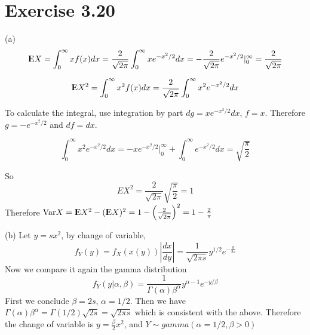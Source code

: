 \documentclass[12pt]{article}
\begin{document}
\section*{Exercise 3.20}
(a) $$ {\rm I\kern-.3em E} X = \int^{\infty}_{0} xf(x) dx = \frac{2}{\sqrt{2\pi}} \int^{\infty}_{0} x e^{-x^2/2} dx
 = - \frac{2}{\sqrt{2\pi}} e^{-x^2/2} |^{\infty}_{0} =  \frac{2}{\sqrt{2\pi}}$$
 
 $${\rm I\kern-.3em E} X^2 = \int^{\infty}_{0} x^2f(x) dx =  \frac{2}{\sqrt{2\pi}} \int^{\infty}_{0} x^2 e^{-x^2/2} dx$$
 
To calculate the integral, use integration by part $dg = x e^{-x^2/2}dx$, $f = x$. Therefore $g = -e^{-x^2/2}$ and $df=dx$. 

$$\int^{\infty}_{0} x^2 e^{-x^2/2} dx = -xe^{-x^2/2}|^{\infty}_{0} + \int^{\infty}_{0} e^{-x^2/2} dx = \sqrt{\frac{\pi}{2}}$$

So $$EX^2 = \frac{2}{\sqrt{2\pi}}  \sqrt{\frac{\pi}{2}} = 1$$
Therefore $\mathrm{Var} X = {\rm I\kern-.3em E} X^2 - ({\rm I\kern-.3em E} X)^2 = 1 - \left( \frac{2}{\sqrt{2\pi}}\right)^2 = 1 - \frac{2}{\pi}$ 

(b) Let $y=sx^2$, by change of variable,
$$ f_Y(y) = f_X(x(y)) \left| \frac{dx}{dy} \right| = \frac{1}{\sqrt{2\pi s}} y^{1/2} e^{-\frac{y}{2s}}$$
Now we compare it again the gamma distribution $$ f_Y(y|\alpha, \beta) = \frac{1}{\Gamma(\alpha)\beta^{\alpha}} y^{\alpha - 1} e^{-y/\beta}$$
First we conclude $\beta = 2s$, $\alpha = 1/2$. Then we have $\Gamma(\alpha)\beta^{\alpha} = \Gamma(1/2)\sqrt{2s} = \sqrt{2\pi s}$ which is consistent with the above. Therefore the change of variable is $y = \frac{\beta}{2} x^2$, and $Y \sim gamma(\alpha=1/2, \beta > 0)$
\end{document}
